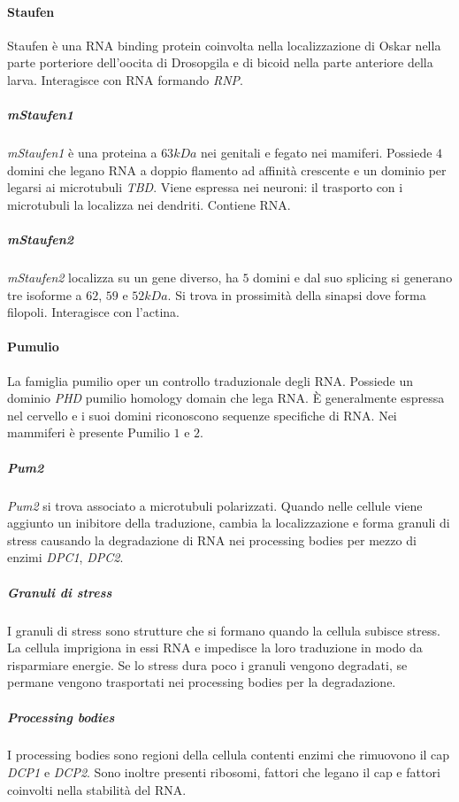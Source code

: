 			\paragraph{Staufen}
			Staufen \`e una RNA binding protein coinvolta nella localizzazione di Oskar nella parte porteriore dell'oocita di Drosopgila e di bicoid nella parte anteriore della larva.
			Interagisce con RNA formando \emph{RNP}.

				\subparagraph{\emph{mStaufen1}}
				\emph{mStaufen1} \`e una proteina a $63kDa$ nei genitali e fegato nei mamiferi.
				Possiede $4$ domini che legano RNA a doppio flamento ad affinit\`a crescente e un dominio per legarsi ai microtubuli \emph{TBD}.
				Viene espressa nei neuroni: il trasporto con i microtubuli la localizza nei dendriti.
				Contiene RNA.

				\subparagraph{\emph{mStaufen2}}
				\emph{mStaufen2} localizza su un gene diverso, ha $5$ domini e dal suo splicing si generano tre isoforme a $62$, $59$ e $52kDa$.
				Si trova in prossimit\`a della sinapsi dove forma filopoli.
				Interagisce con l'actina.

			\paragraph{Pumulio}
			La famiglia pumilio oper un controllo traduzionale degli RNA.
			Possiede un dominio \emph{PHD} pumilio homology domain che lega RNA.
			\`E generalmente espressa nel cervello e i suoi domini riconoscono sequenze specifiche di RNA.
			Nei mammiferi \`e presente Pumilio $1$ e $2$.

				\subparagraph{\emph{Pum2}}
				\emph{Pum2} si trova associato a microtubuli polarizzati.
				Quando nelle cellule viene aggiunto un inibitore della traduzione, cambia la localizzazione e forma granuli di stress causando la degradazione di RNA nei processing bodies per mezzo di enzimi \emph{DPC1}, \emph{DPC2}.

				\subparagraph{Granuli di stress}
				I granuli di stress sono strutture che si formano quando la cellula subisce stress.
				La cellula imprigiona in essi RNA e impedisce la loro traduzione in modo da risparmiare energie.
				Se lo stress dura poco i granuli vengono degradati, se permane vengono trasportati nei processing bodies per la degradazione.

				\subparagraph{Processing bodies}
				I processing bodies sono regioni della cellula contenti enzimi che rimuovono il cap \emph{DCP1} e \emph{DCP2}.
				Sono inoltre presenti ribosomi, fattori che legano il cap e fattori coinvolti nella stabilit\`a del RNA.
